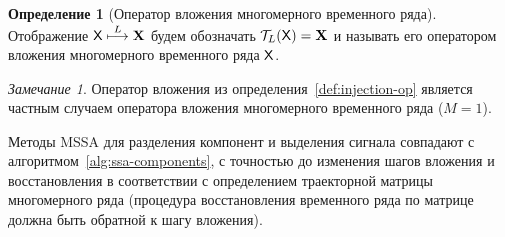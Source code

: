 \documentclass[specialist,
  substylefile = spbu.rtx,
subf,href,colorlinks=true, 12pt]{disser}
\theoremstyle{plain}
\theoremstyle{definition}
\newtheorem{definition}{Определение}[section]
\theoremstyle{remark}
\newtheorem{remark}{Замечание}[section]
\begin{document}
\begin{definition}[Оператор вложения многомерного временного ряда]
  Отображение $\mathsf{X} \stackrel{L}{\longmapsto} \mathbf{X}$ будем обозначать
  $\mathcal{T}_L(\mathsf{X}) = \mathbf{X}$ и называть его оператором вложения многомерного
  временного ряда $\mathsf{X}$.
\end{definition}

\begin{remark}
  Оператор вложения из определения~\ref{def:injection-op} является
  частным случаем оператора вложения многомерного временного ряда
  ($M=1$).
\end{remark}

Методы MSSA для разделения компонент и выделения сигнала совпадают с
алгоритмом~\ref{alg:ssa-components}, с точностью до изменения шагов
вложения и восстановления в соответствии с определением траекторной
матрицы многомерного ряда (процедура восстановления временного ряда по
матрице должна быть обратной к шагу вложения).
\end{document}
